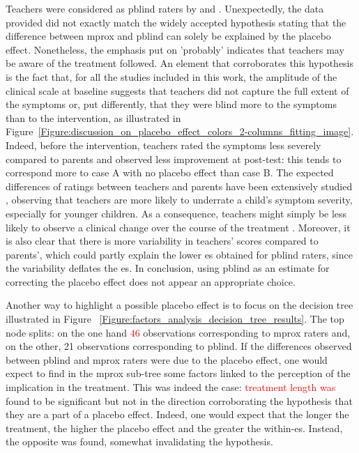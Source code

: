 Teachers were considered as \gls{pblind} raters by \citeauthor{Cortese2016} and \citeauthor{Micoulaud2014}.
Unexpectedly, the data provided did not exactly match the widely accepted hypothesis stating that the difference between
\gls{mprox} and \gls{pblind} can solely be explained by the placebo effect. 
Nonetheless, the emphasis put on 'probably' indicates that teachers may be aware of the treatment followed. 
An element that corroborates this hypothesis is the fact that, for all the studies included in this work, the amplitude 
of the clinical scale at baseline suggests that teachers did not capture the full extent of the symptoms or, put differently, 
that they were blind more to the symptoms than to the intervention, as illustrated 
in Figure~\ref{Figure:discussion_on_placebo_effect_colors_2-columns_fitting_image}. 
Indeed, before the intervention, teachers rated the symptoms less severely compared to parents and observed less improvement at post-test: 
this tends to correspond more to case A with no placebo effect than case B. The expected differences of ratings between 
teachers and parents have been extensively studied \citep{Sollie2013, Narad2015, Minder2018}, observing that teachers are more 
likely to underrate a child's symptom severity, especially for younger children. As a consequence, teachers might simply be less likely 
to observe a clinical change over the course of the treatment \citep{Sollie2013, Narad2015, Minder2018}. Moreover, it is also clear 
that there is more variability in teachers' scores compared to parents', which could partly explain the lower \gls{es} obtained for 
\gls{pblind} raters, since the variability deflates the \gls{es}. In conclusion, using \gls{pblind} as an estimate for correcting the 
placebo effect does not appear an appropriate choice. 

Another way to highlight a possible placebo effect is to focus on the decision tree illustrated in Figure
~\ref{Figure:factors_analysis_decision_tree_results}.
The top node splits: on the one hand \textcolor{red}{46} observations corresponding to \gls{mprox} raters and, on the other, 
21 observations corresponding to \gls{pblind}. If the differences observed between \gls{pblind} and \gls{mprox} raters were 
due to the placebo effect, one would expect to find in the \gls{mprox} sub-tree some factors linked to the perception
of the implication in the treatment. This was indeed the case: \textcolor{red}{treatment length was} found to be significant but not in the
direction corroborating the hypothesis that they are a part of a placebo effect. Indeed, one would expect that the
longer the treatment, the higher the placebo effect and the greater the within-\gls{es}. Instead, the opposite was found, 
somewhat invalidating the hypothesis. 

